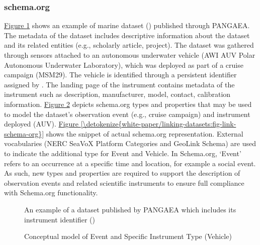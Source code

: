 \documentclass[a4paper,10pt,english]{sphinxmanual}
\begin{document}
\subsubsection{schema.org}
\label{\detokenize{white-paper/linking-datasets:schema-org}}
\sphinxAtStartPar
\hyperref[\detokenize{white-paper/linking-datasets:fig-link-pangea}]{Figure \ref{\detokenize{white-paper/linking-datasets:fig-link-pangea}}} shows an example of marine dataset
() published through PANGAEA. The
metadata of the dataset includes descriptive information about the
dataset and its related entities (e.g., scholarly article, project). The
dataset was gathered through sensors attached to an autonomous
underwater vehicle (AWI AUV Polar Autonomous Underwater Laboratory),
which was deployed as part of a cruise campaign (MSM29). The vehicle is
identified through a persistent identifier assigned by
. The landing page of the instrument contains
metadata of the instrument such as description, manufacturer, model,
contact, calibration information. \hyperref[\detokenize{white-paper/linking-datasets:fig-link-model}]{Figure \ref{\detokenize{white-paper/linking-datasets:fig-link-model}}} depicts
schema.org types and properties that may be used to model the
dataset’s observation event (e.g., cruise campaign) and instrument
deployed (AUV). \hyperref[\detokenize{white-paper/linking-datasets:fig-link-schema-org}]{Figure \ref{\detokenize{white-paper/linking-datasets:fig-link-schema-org}}} shows the snippet of
actual schema.org representation. External vocabularies (NERC SeaVoX
Platform Categories and GeoLink Schema) are used to indicate the
additional type for Event and Vehicle. In Schema.org, ‘Event’ refers
to an occurrence at a specific time and location, for example a social
event. As such, new types and properties are required to support the
description of observation events and related scientific instruments
to ensure full compliance with Schema.org functionality.

\begin{figure}[htbp]
\centering
\capstart

\noindent{}
\caption{An example of a dataset published by PANGAEA which includes its
instrument identifier
()}\label{\detokenize{white-paper/linking-datasets:fig-link-pangea}}\end{figure}

\begin{figure}[htbp]
\centering
\capstart

\noindent{}
\caption{Conceptual model of Event and Specific Instrument Type (Vehicle)}\label{\detokenize{white-paper/linking-datasets:fig-link-model}}\end{figure}
\end{document}
